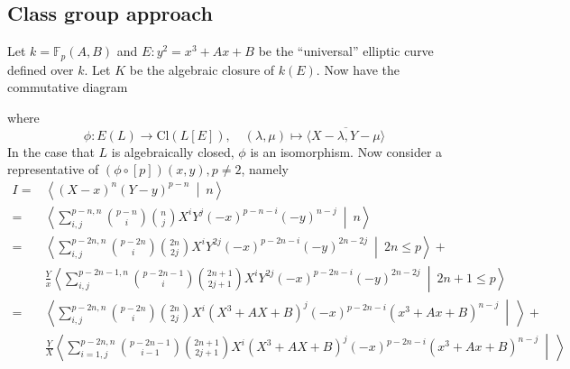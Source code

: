 \documentclass{scrartcl}
\newcommand{\F}{\mathbb{F}}
\theoremstyle{definition}
\begin{document}
\subsection*{Class group approach}
Let $k = \F_p(A, B)$ and $E: y^2 = x^3 + Ax + B$ be the ``universal'' elliptic curve defined over $k$.
Let $K$ be the algebraic closure of $k(E)$.
Now have the commutative diagram
\begin{center}
\end{center}
where
\begin{equation*}
    \phi: E(L) \to \mathrm{Cl}(L[E]), \quad (\lambda, \mu) \mapsto \overline{\langle X - \lambda, Y - \mu \rangle}
\end{equation*}
In the case that $L$ is algebraically closed, $\phi$ is an isomorphism.
Now consider a representative of $(\phi \circ [p])(x, y), p \neq 2$, namely
\begin{align*}
    I =& \left\langle (X - x)^n (Y - y)^{p - n} \ \middle| \ n \right\rangle \\
    =& \left\langle \sum_{i, j}^{p - n, n} {p - n \choose i}{n \choose j} X^i Y^j (-x)^{p - n - i} (-y)^{n - j} \ \middle| \ n \right\rangle \\
    =& \left\langle \sum_{i, j}^{p - 2n, n} {p - 2n \choose i}{2n \choose 2j} X^i Y^{2j} (-x)^{p - 2n - i} (-y)^{2n - 2j} \ \middle| \ 2n \leq p \right\rangle + \\
    & \frac Y x \left\langle \sum_{i, j}^{p - 2n - 1, n} {p - 2n - 1 \choose i}{2n + 1 \choose 2j + 1} X^i Y^{2j} (-x)^{p - 2n - i} (-y)^{2n - 2j} \ \middle| \ 2n + 1 \leq p \right\rangle \\
    =& \left\langle \sum_{i, j}^{p - 2n, n} {p - 2n \choose i}{2n \choose 2j} X^i (X^3 + AX + B)^j (-x)^{p - 2n - i} (x^3 + Ax + B)^{n - j} \ \middle| \ \right\rangle + \\
    & \frac Y X \left\langle \sum_{i = 1, j}^{p - 2n, n} {p - 2n - 1 \choose i - 1}{2n + 1 \choose 2j + 1} X^i (X^3 + AX + B)^j (-x)^{p - 2n - i} (x^3 + Ax + B)^{n - j} \ \middle| \ \right\rangle
\end{align*}
\end{document}
